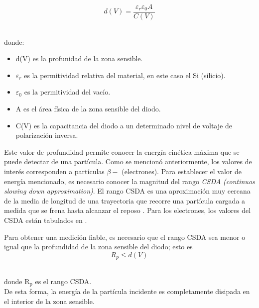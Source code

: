 \documentclass[a4paper,conference]{IEEEtran}
\begin{document}
        \begin{equation}
            \label{d_x}
            d(V) = \frac{\varepsilon_{r}\varepsilon_{0}A}{C(V)}
        \end{equation}

        \hfill \\ donde:
        \begin{itemize}
            \item d(V) es la profunidad de la zona sensible.
            \item $\varepsilon_{r}$ es la permitividad relativa del material, en este caso el Si
                (silicio).
            \item $\varepsilon_{0}$ es la permitividad del vacío.
            \item A es el área física de la zona sensible del diodo.
            \item C(V) es la capacitancia del diodo a un determinado nivel de
                voltaje de polarización inversa.
        \end{itemize}

        Este valor de profundidad permite conocer la energía cinética máxima que
        se puede detectar de una partícula. Como se mencionó anteriormente, los
        valores de interés corresponden a partículas $\beta-$ (electrones). Para
        establecer el valor de energía mencionado, es necesario conocer la
        magnitud del rango \emph{CSDA (continuos slowing down approximation)}.
        El rango CSDA es una aproximación muy cercana de la media de longitud de
        una trayectoria que recorre una partícula cargada a medida que se frena
        hasta alcanzar el reposo \cite{nist}. Para los electrones, los valores
        del CSDA están tabulados en \cite{nist}.\par 
        Para obtener una medición fiable, es necesario que el rango CSDA sea
        menor o igual que la profundidad de la zona sensible del diodo; esto es
        \begin{equation}
            R_{p} \leq d(V)
            \label{eq:range}
        \end{equation}

        \hfill \\ donde $\mathrm{R_{p}}$ es el rango CSDA.\\
        De esta forma, la energía de la partícula incidente es completamente
        disipada en el interior de la zona sensible.
\end{document}

